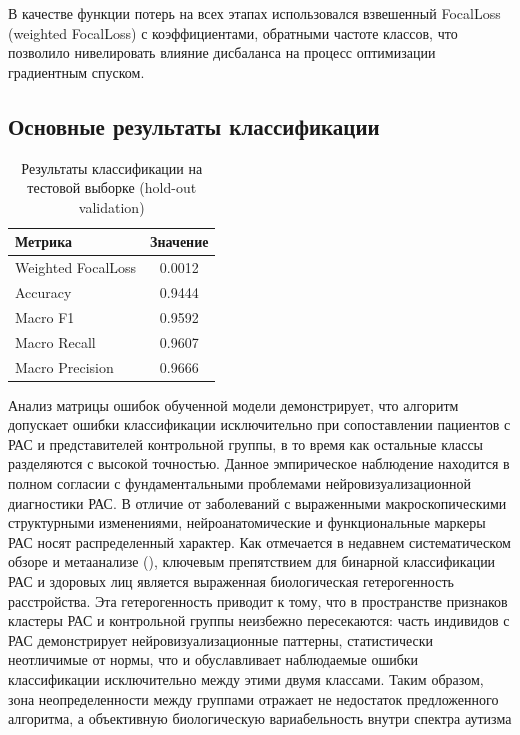 \documentclass[eqsecnum, authorsinfo]{kioj6}
\begin{document}
В качестве функции потерь на всех этапах использовался взвешенный FocalLoss (weighted FocalLoss) \cite{lin2018focallossdenseobject} с коэффициентами, обратными 
частоте классов, что позволило нивелировать влияние дисбаланса на процесс оптимизации градиентным спуском.

\subsection{Основные результаты классификации}

\begin{table}[htbp]
    \centering
    \caption{Результаты классификации на тестовой выборке (hold-out validation)}
    \label{tab:hold-out-results}
    \begin{tabular}{l||c}
        \toprule
        \textbf{Метрика} & \textbf{Значение} \\
        \midrule
        Weighted FocalLoss & 0.0012 \\
        Accuracy & 0.9444 \\
        Macro F1 & 0.9592 \\
        Macro Recall & 0.9607 \\
        Macro Precision & 0.9666 \\
        \bottomrule
    \end{tabular}
\end{table}

Анализ матрицы ошибок обученной модели демонстрирует, что алгоритм допускает ошибки классификации исключительно при сопоставлении пациентов с РАС 
и представителей контрольной группы, в то время как остальные классы разделяются с высокой точностью. Данное эмпирическое наблюдение находится 
в полном согласии с фундаментальными проблемами нейровизуализационной диагностики РАС. В отличие от заболеваний с выраженными макроскопическими 
структурными изменениями, нейроанатомические и функциональные маркеры РАС носят распределенный характер. Как отмечается в недавнем 
систематическом обзоре и метаанализе (\cite{7}), ключевым препятствием для бинарной классификации РАС и здоровых лиц является выраженная 
биологическая гетерогенность расстройства. Эта гетерогенность приводит к тому, что в пространстве признаков кластеры РАС и контрольной группы 
неизбежно пересекаются: часть индивидов с РАС демонстрирует нейровизуализационные паттерны, статистически неотличимые от нормы, что и 
обуславливает наблюдаемые ошибки классификации исключительно между этими двумя классами. Таким образом, зона неопределенности между группами 
отражает не недостаток предложенного алгоритма, а объективную биологическую вариабельность внутри спектра аутизма
\end{document}
